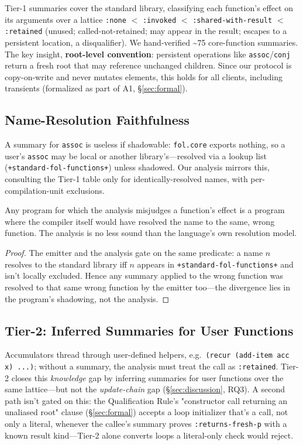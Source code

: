 \documentclass[sigplan,review,anonymous]{acmart}
\begin{document}
Tier-1 summaries cover the standard library, classifying each function's effect on its arguments over a lattice \texttt{:none} $<$ \texttt{:invoked} $<$ \texttt{:shared-with-result} $<$ \texttt{:retained} (unused; called-not-retained; may appear in the result; escapes to a persistent location, a disqualifier). We hand-verified \textasciitilde75 core-function summaries. The key insight, \textbf{root-level convention}: persistent operations like \texttt{assoc}/\texttt{conj} return a fresh root that may reference unchanged children. Since our protocol is copy-on-write and never mutates elements, this holds for all clients, including transients (formalized as part of A1, §\ref{sec:formal}).

\subsection{Name-Resolution Faithfulness}
\label{sec:nameres}

A summary for \texttt{assoc} is useless if shadowable: \texttt{fol.core} exports nothing, so a user's \texttt{assoc} may be local or another library's---resolved via a lookup list (\texttt{+standard-fol-functions+}) unless shadowed. Our analysis mirrors this, consulting the Tier-1 table only for identically-resolved names, with per-compilation-unit exclusions.

\begin{lemma}
\label{lem:nameres}
Any program for which the analysis misjudges a function's effect is a program where the compiler itself would have resolved the name to the same, wrong function. The analysis is no less sound than the language's own resolution model.
\end{lemma}
\begin{proof}
The emitter and the analysis gate on the same predicate: a name $n$ resolves to the standard library iff $n$ appears in \texttt{+standard-fol-functions+} and isn't locally excluded. Hence any summary applied to the wrong function was resolved to that same wrong function by the emitter too---the divergence lies in the program's shadowing, not the analysis.
\end{proof}

\subsection{Tier-2: Inferred Summaries for User Functions}
\label{sec:tier2}

Accumulators thread through user-defined helpers, e.g.\ \texttt{(recur (add-item acc x) ...)}; without a summary, the analysis must treat the call as \texttt{:retained}. Tier-2 closes this \emph{knowledge} gap by inferring summaries for user functions over the same lattice---but not the \emph{update-chain} gap (§\ref{sec:discussion}, RQ3). A second path isn't gated on this: the Qualification Rule's "constructor call returning an unaliased root" clause (§\ref{sec:formal}) accepts a loop initializer that's a call, not only a literal, whenever the callee's summary proves \texttt{:returns-fresh-p} with a known result kind---Tier-2 alone converts loops a literal-only check would reject.
\end{document}
